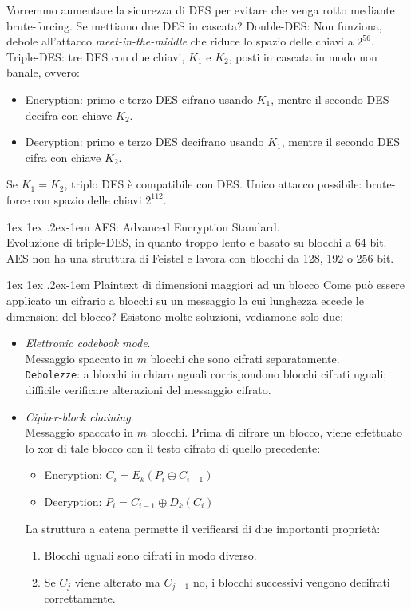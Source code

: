 \documentclass[a4paper, 11pt, twoside, openright, fleqn]{report}
\makeatletter
\renewcommand{\paragraph}{%
	\@startsection{paragraph}{4}%
	{\z@}{1ex \@plus 1ex \@minus .2ex}{-1em}%
	{\normalfont\normalsize\bfseries}%
}
\makeatother
\begin{document}
Vorremmo aumentare la sicurezza di DES per evitare che venga rotto mediante brute-forcing. Se mettiamo due DES in cascata? Double-DES: Non funziona, debole all'attacco \emph{meet-in-the-middle} che riduce lo spazio delle chiavi a $2^{56}$.\\
Triple-DES: tre DES  con due chiavi, $K_1$ e $K_2$, posti in cascata in modo non banale, ovvero:
\begin{itemize}
	\item Encryption: primo e terzo DES cifrano usando $K_1$, mentre il secondo DES decifra con chiave $K_2$.
	\item Decryption: primo e terzo DES decifrano usando $K_1$, mentre il secondo DES cifra con chiave $K_2$.
\end{itemize}
Se $K_1 = K_2$, triplo DES è compatibile con DES. Unico attacco possibile: brute-force con spazio delle chiavi $2^{112}$.

\paragraph{AES:} Advanced Encryption Standard.\\
Evoluzione di triple-DES, in quanto troppo lento e basato su blocchi a 64 bit. AES non ha una struttura di Feistel e lavora con blocchi da 128, 192 o 256 bit.

\paragraph{Plaintext di dimensioni maggiori ad un blocco}
Come può essere applicato un cifrario a blocchi su un messaggio la cui lunghezza eccede le dimensioni del blocco? Esistono molte soluzioni, vediamone solo due:
\begin{itemize}
	\item \emph{Elettronic codebook mode}.\\
	Messaggio spaccato in $m$ blocchi che sono cifrati separatamente.\\
	\texttt{Debolezze}: a blocchi in chiaro uguali corrispondono blocchi cifrati uguali; difficile verificare alterazioni del messaggio cifrato.
	\item \emph{Cipher-block chaining}.\\
	Messaggio spaccato in $m$ blocchi. Prima di cifrare un blocco, viene effettuato lo xor di tale blocco con il testo cifrato di quello precedente:
	\begin{itemize}
		\item[] Encryption: $C_i = E_k(P_i \oplus C_{i-1})$
		\item[] Decryption: $P_i = C_{i-1} \oplus D_k(C_i)$
	\end{itemize}
	La struttura a catena permette il verificarsi di due importanti proprietà:
	\begin{enumerate}
		\item Blocchi uguali sono cifrati in modo diverso.
		\item Se $C_j$ viene alterato ma $C_{j+1}$ no, i blocchi successivi vengono decifrati correttamente.
	\end{enumerate}
\end{itemize}
\end{document}
